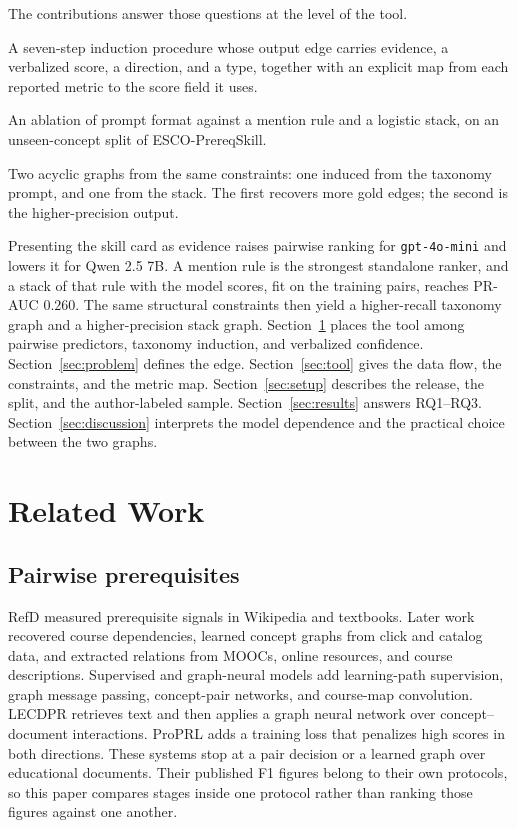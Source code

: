 \documentclass{ws-ijait}
\begin{document}
The contributions answer those questions at the level of the tool.
\begin{romanlist}[(iii)]
\item A seven-step induction procedure whose output edge carries
evidence, a verbalized score, a direction, and a type, together
with an explicit map from each reported metric to the score field
it uses.
\item An ablation of prompt format against a mention rule and a
logistic stack, on an unseen-concept split of
{ESCO-PrereqSkill}\cite{Le_2025}.
\item Two acyclic graphs from the same constraints: one induced
from the taxonomy prompt, and one from the stack.
The first recovers more gold edges; the second is the
higher-precision output.
\end{romanlist}
Presenting the skill card as evidence raises pairwise ranking for
\texttt{gpt-4o-mini} and lowers it for {Qwen} 2.5 7B.
A mention rule is the strongest standalone ranker, and a stack of
that rule with the model scores, fit on the training pairs, reaches
{PR}-{AUC} $0.260$.
The same structural constraints then yield a higher-recall taxonomy
graph and a higher-precision stack graph.
Section~\ref{sec:related} places the tool among pairwise predictors,
taxonomy induction, and verbalized confidence.
Section~\ref{sec:problem} defines the edge.
Section~\ref{sec:tool} gives the data flow, the constraints, and
the metric map.
Section~\ref{sec:setup} describes the release, the split, and the
author-labeled sample.
Section~\ref{sec:results} answers {RQ1}--{RQ3}.
Section~\ref{sec:discussion} interprets the model dependence and
the practical choice between the two graphs.

\section{Related Work}
\label{sec:related}

\subsection{Pairwise prerequisites}
RefD\cite{Liang_2015} measured prerequisite signals in Wikipedia
and textbooks.
Later work recovered course dependencies\cite{Liang_2017}, learned
concept graphs from click and catalog data\cite{Yang_2015,Liu_2016},
and extracted relations from {MOOCs}\cite{Pan_2017}, online
resources\cite{Roy_2019}, and course descriptions\cite{Xiao_2022}.
Supervised and graph-neural models add learning-path
supervision\cite{Sun_2024}, graph message passing\cite{Zhang_2025},
concept-pair networks\cite{Mazumder_2023}, and course-map
convolution\cite{Xia_2023}.
{LECDPR}\cite{Xiao_2026} retrieves text and then applies a graph
neural network over concept--document interactions.
{ProPRL}\cite{Cheng_2026} adds a training loss that penalizes high
scores in both directions.
These systems stop at a pair decision or a learned graph over
educational documents.
Their published {F1} figures belong to their own protocols, so this
paper compares stages inside one protocol rather than ranking those
figures against one another.
\end{document}
